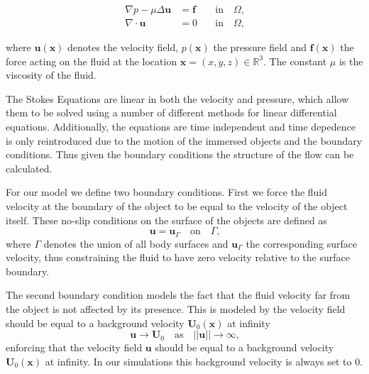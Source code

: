\documentclass[a4paper,11pt]{kth-mag}
\begin{document}
\begin{equation}
\label{eq:stokes_equations}
\begin{aligned}
    \nabla p - \mu \Delta \mathbf{u} &= \mathbf{f} \quad &\text{in} \quad \Omega \text{,}\\
    \nabla \cdot \mathbf{u} &= 0 \quad &\text{in} \quad \Omega \text{,}
\end{aligned}
\end{equation}

where $\mathbf{u}(\mathbf{x})$ denotes the velocity field, $p(\mathbf{x})$ the pressure field and $\mathbf{f}(\mathbf{x})$ the force acting on the fluid at the location $\mathbf{x} = (x,y,z) \in \mathbb{R}^3$.
The constant $\mu$ is the viscosity of the fluid.

The Stokes Equations are linear in both the velocity and pressure, which allow them to be solved using a number of different methods for linear differential equations. Additionally, the equations are time independent and time depedence is only reintroduced due to the motion of the immersed objects and the boundary conditions. Thus given the boundary conditions the structure of the flow can be calculated.

For our model we define two boundary conditions. First we force the fluid velocity at the boundary of the object to be equal to the velocity of the object itself. These no-slip conditions on the surface of the objects are defined as
\begin{equation}
  \label{eq:boundary_condition_surface}
  \mathbf{u} = \mathbf{u}_\Gamma  \quad \text{on} \quad  \Gamma \text{,}
\end{equation}
where $\Gamma$ denotes the union of all body surfaces and $\mathbf{u}_\Gamma$ the corresponding surface velocity, thus constraining the fluid to have zero velocity relative to the surface boundary.

The second boundary condition models the fact that the fluid velocity far from the object is not affected by its presence. This is modeled by the velocity field should be equal to a background velocity $\mathbf{U}_0(\mathbf{x})$ at infinity
\begin{equation}
  \label{eq:boundary_condition_background}
  \mathbf{u} \rightarrow \mathbf{U}_0 \quad \text{as} \quad ||\mathbf{u}|| \rightarrow \infty \text{,}
\end{equation}
enforcing that the velocity field $\mathbf{u}$ should be equal to a background velocity $\mathbf{U}_0(\mathbf{x})$ at infinity. In our simulations this background velocity is always set to $0$.
\end{document}
